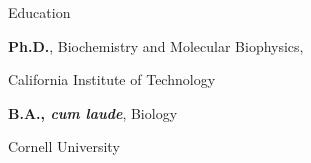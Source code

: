 \begin{rubric}{Education}

\entry*[2013--2018]
	\textbf{Ph.D.}, Biochemistry and Molecular Biophysics,
	\par California Institute of Technology


\entry*[2009--2013]%
	\textbf{B.A., \emph{cum laude}}, Biology\par
	\par Cornell University
\end{rubric}
